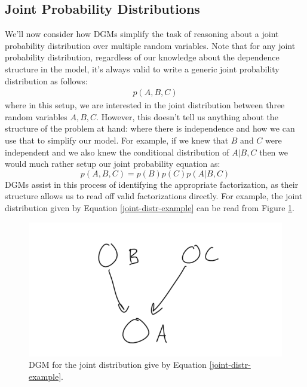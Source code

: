 \subsection{Joint Probability Distributions}
We'll now consider how DGMs simplify the task of reasoning about a joint probability distribution over multiple random variables. Note that for any joint probability distribution, regardless of our knowledge about the dependence structure in the model, it's always valid to write a generic joint probability distribution as follows:
\begin{align*}
	p(A, B, C)
\end{align*}
where in this setup, we are interested in the joint distribution between three random variables $A, B, C$. However, this doesn't tell us anything about the structure of the problem at hand: where there is independence and how we can use that to simplify our model. For example, if we knew that $B$ and $C$ were independent and we also knew the conditional distribution of $A | B, C$ then we would much rather setup our joint probability equation as:
\begin{equation} \label{joint-distr-example}
	p(A, B, C) = p(B)p(C)p(A | B, C)
\end{equation}
DGMs assist in this process of identifying the appropriate factorization, as their structure allows us to read off valid factorizations directly. For example, the joint distribution given by Equation \ref{joint-distr-example} can be read from Figure \ref{fig:joint-distr-example-dgm}.
\begin{figure}
    \centering
    \includegraphics[width=0.5\paperwidth]{../GraphicalModels/fig/joint-distr-example-dgm.png}
    \caption{DGM for the joint distribution give by Equation \ref{joint-distr-example}.}
    \label{fig:joint-distr-example-dgm}
\end{figure}

